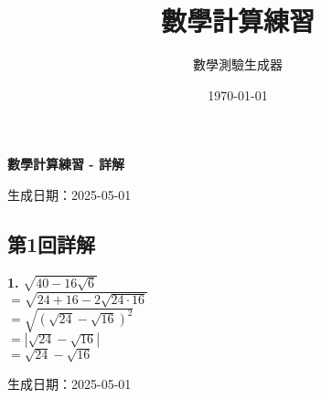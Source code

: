 \documentclass[a4paper,11pt]{article}
\title{\huge 數學計算練習}
\author{\large 數學測驗生成器}
\date{\large \today}
\renewcommand{\Large}{\fontsize{16pt}{20pt}\selectfont}
\newcommand{\explanationbox}[1]{%
  \begin{tcolorbox}[explanationstyle]
    #1
  \end{tcolorbox}
}
\begin{document}
\begin{center}
{\Large \textbf{數學計算練習 - 詳解}}
\end{center}

\noindent 生成日期：2025-05-01\hfill

\subsection*{第1回詳解}

\begin{multicols}{2}
\explanationbox{\textbf{1.} $\sqrt{40 - 16 \sqrt{6}}$ \\ $= \sqrt{24+16 - 2\sqrt{24\cdot16}}$ \\ $= \sqrt{(\sqrt{24} - \sqrt{16})^2}$ \\ $= |\sqrt{24} - \sqrt{16}|$ \\ $= \sqrt{24} - \sqrt{16}$}

\end{multicols}

\vfill
\begin{center}
\small{生成日期：2025-05-01}
\end{center}
\end{document}
